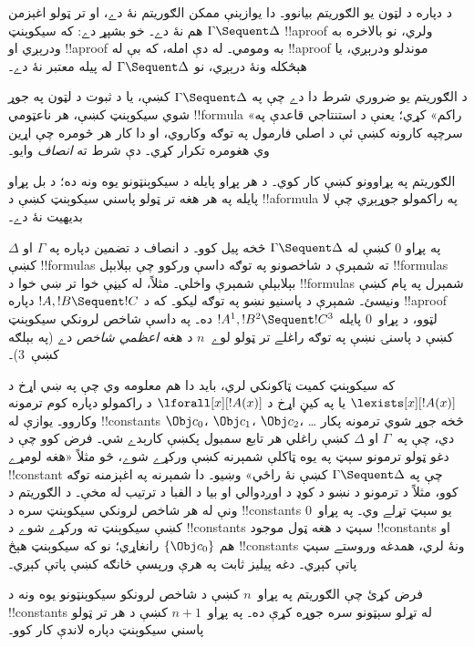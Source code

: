 \documentclass[../../../include/open-logic-section]{subfiles}
\begin{document}


د  دپاره د لټون يو الګوريتم بيانوو۔ دا يوازېنې
ممکن الګوريتم نۀ دے، او تر ټولو اغېزمن هم نۀ دے۔ خو بشپړ دے:
که سيکوېنټ $\Gamma \Sequent \Delta$ !!a{proof} ولري، نو
بالاخره به ودرېږي او !!a{proof} به ومومي۔ له دې امله،
که بې له !!a{proof} موندلو ودرېږي، يا هېڅکله ونۀ درېږي، نو
$\Gamma \Sequent \Delta$ له پيله معتبر نۀ دے۔

د الګوريتم يو ضروري شرط دا دے چې په
$\Gamma \Sequent \Delta$ کښې، يا د ثبوت د لټون په جوړ شوي
سيکوېنټ کښې، هر ناعټومي !!{formula} «راکم» کړي؛ يعنې د
استنتاجي قاعدې په سرچپه کارونه کښې ئې د اصلي فارمول په توګه
وکاروي، او دا کار هر څومره چې اړين وي هغومره تکرار کړي۔ دې
شرط ته \emph{انصاف} وايو۔

الګوريتم په پړاوونو کښې کار کوي۔ د هر پړاو پايله د
سيکوېنټونو يوه ونه ده؛ د بل پړاو پايله په هر هغه تر ټولو
پاسني سيکوېنټ کښې د !!a{formula} په راکمولو جوړېږي چې لا
بديهيت نۀ دے۔

په پړاو $0$ کښې له $\Gamma \Sequent \Delta$ څخه
پيل کوو۔ د انصاف د تضمين دپاره په $\Gamma$ او $\Delta$ کښې
!!{formula}s ته شمېرې د شاخصونو په توګه داسې ورکوو چې بېلابېل
!!{formula}s بېلابېلې شمېرې واخلي۔ مثلاً، له کيڼې خوا تر ښي
خوا د !!{formula}s شمېرل په پام کښې ونيسئ۔ شمېرې د پاسنيو
نښو په توګه ليکو۔ که د $!A, !B \Sequent !C$ دپاره !!a{proof}
لټوو، د پړاو~$0$ پايله $!A^1, !B^2 \Sequent !C^3$ ده۔ په
داسې شاخص لرونکي سيکوېنټ کښې د پاسنۍ نښې په توګه راغلے تر
ټولو لوے~$n$ د هغه \emph{اعظمي شاخص} دے (په بېلګه کښې~$3$)۔

که سيکوېنټ کميت ټاکونکي لري، بايد دا هم معلومه وي چې
په ښي اړخ د $\lexists[x][!A(x)]$ يا په کيڼ اړخ د
$\lforall[x][!A(x)]$ د راکمولو دپاره کوم ترمونه وکاروو۔ يوازې
له !!{constant}s $\Obj c_0$، $\Obj c_1$، $\Obj c_2$، \dots
څخه جوړ شوي ترمونه پکار دي، چې په~$\Gamma$ او $\Delta$ کښې
راغلي هر تابع سمبول پکښې کارېدے شي۔ فرض کوو چې د دغو ټولو
ترمونو سېټ په يوه ټاکلې شمېرنه کښې ورکړے شوے، څو مثلاً «هغه
لومړے !!{constant} چې په $\Gamma \Sequent \Delta$ کښې نۀ
راځي» وښيو۔ دا شمېرنه په اغېزمنه توګه کوو، مثلاً د ترمونو د نښو د کوډ د اوږدوالي او بيا د الفبا د ترتيب له مخې۔ د الګوريتم د ونې له هر شاخص لرونکي سيکوېنټ سره
د !!{constant}s يو سېټ تړلے وي۔ په پړاو~$0$ کښې سيکوېنټ ته
ورکړے شوے د !!{constant}s سېټ د هغه ټول موجود
!!{constant}s او هم $\{\Obj c_0\}$ رانغاړي؛ نو که سيکوېنټ
هېڅ !!{constant}s ونۀ لري، همدغه وروستے سېټ پاتې کېږي۔
دغه پيليز ثابت په هرې ورپسې څانګه کښې پاتې کېږي۔

فرض کړئ چې الګوريتم په پړاو~$n$ کښې د شاخص لرونکو
سيکوېنټونو يوه ونه د !!{constant}s له تړلو سېټونو سره جوړه
کړې ده۔ په پړاو~$n+1$ کښې د هر تر ټولو پاسني سيکوېنټ دپاره
لاندې کار کوو۔
\end{document}
